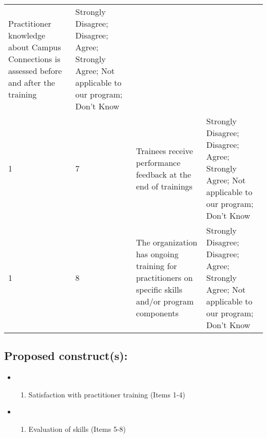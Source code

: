 \documentclass[]{article}
\providecommand{\tightlist}{%
  \setlength{\itemsep}{0pt}\setlength{\parskip}{0pt}}
\begin{document}
\begin{longtable}[]{@{}llll@{}}
\begin{minipage}[t]{0.41\columnwidth}
Practitioner knowledge about Campus Connections is assessed before and
after the training\strut
\end{minipage} & \begin{minipage}[t]{0.39\columnwidth}\raggedright\strut
Strongly Disagree; Disagree; Agree; Strongly Agree; Not applicable to
our program; Don't Know\strut
\end{minipage}\tabularnewline
\begin{minipage}[t]{0.05\columnwidth}\raggedright\strut
1\strut
\end{minipage} & \begin{minipage}[t]{0.04\columnwidth}\raggedright\strut
7\strut
\end{minipage} & \begin{minipage}[t]{0.41\columnwidth}\raggedright\strut
Trainees receive performance feedback at the end of trainings\strut
\end{minipage} & \begin{minipage}[t]{0.39\columnwidth}\raggedright\strut
Strongly Disagree; Disagree; Agree; Strongly Agree; Not applicable to
our program; Don't Know\strut
\end{minipage}\tabularnewline
\begin{minipage}[t]{0.05\columnwidth}\raggedright\strut
1\strut
\end{minipage} & \begin{minipage}[t]{0.04\columnwidth}\raggedright\strut
8\strut
\end{minipage} & \begin{minipage}[t]{0.41\columnwidth}\raggedright\strut
The organization has ongoing training for practitioners on specific
skills and/or program components\strut
\end{minipage} & \begin{minipage}[t]{0.39\columnwidth}\raggedright\strut
Strongly Disagree; Disagree; Agree; Strongly Agree; Not applicable to
our program; Don't Know\strut
\end{minipage}\tabularnewline
\bottomrule
\end{longtable}

\subsection{\texorpdfstring{\textbf{Proposed
construct(s)}:}{Proposed construct(s):}}\label{proposed-constructs}

\begin{itemize}
\item
  \begin{enumerate}
  \def\labelenumi{\arabic{enumi}.}
  \tightlist
  \item
    Satisfaction with practitioner training (Items 1-4)
  \end{enumerate}
\item
  \begin{enumerate}
  \def\labelenumi{\arabic{enumi}.}
  \setcounter{enumi}{1}
  \tightlist
  \item
    Evaluation of skills (Items 5-8)
  \end{enumerate}
\end{itemize}
\end{document}
